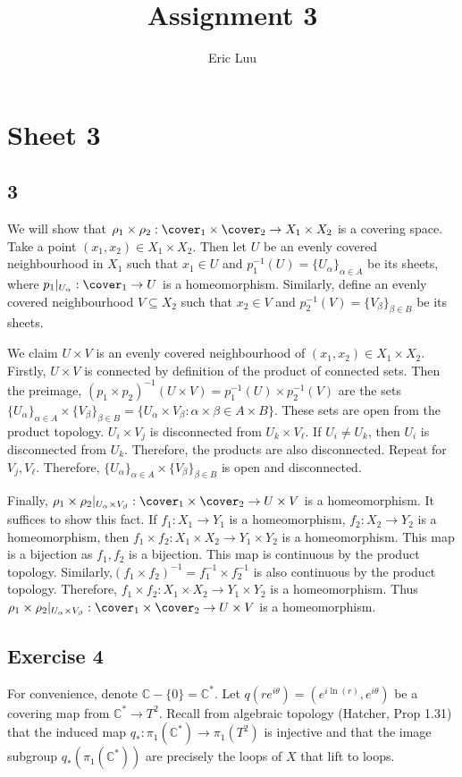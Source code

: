 \documentclass{article}
\title{Assignment 3}
\author{Eric Luu}
\theoremstyle{definition}
\numberwithin{theorem}{section}
\numberwithin{equation}{section}
\begin{document}
\section{Sheet 3}
\subsection{3}
We will show that $\rho_1 \times \rho_2: \cover_1 \times \cover_2 \rightarrow X_1 \times X_2$ is a covering space. 
Take a point $(x_1, x_2) \in X_1 \times X_2$. Then let $U$ be an evenly covered neighbourhood in $X_1$ such that $x_1 \in U$ and $p_1^{-1}(U) = \{U_\alpha \}_{\alpha \in A}$ be its sheets, where $p_1|_{U_\alpha}: \cover_1 \rightarrow U$ is a homeomorphism. Similarly, define an evenly covered neighbourhood $V \subseteq X_2$ such that $x_2 \in V$ and $p_2^{-1}(V) = \{V_\beta \}_{\beta \in B}$ be its sheets. 

We claim $U \times V$ is an evenly covered neighbourhood of $(x_1, x_2) \in X_1 \times X_2$. Firstly, $U \times V$ is connected by definition of the product of connected sets. Then the preimage, $(p_1 \times p_2)^{-1}(U \times V) = p_1^{-1}(U) \times p_2^{-1}(V)$ are the sets $\{U_\alpha \}_{\alpha \in A} \times \{V_\beta \}_{\beta \in B} = \{U_\alpha \times V_\beta : \alpha \times \beta \in A \times B\}$. These sets are open from the product topology. $U_i \times V_j$ is disconnected from $U_k \times V_\ell$. If $U_i \neq U_k$, then $U_i$ is disconnected from $U_k$. Therefore, the products are also disconnected. Repeat for $V_j, V_\ell$. Therefore, $\{U_\alpha \}_{\alpha \in A} \times \{V_\beta \}_{\beta \in B} $ is open and disconnected.

Finally, $\rho_1 \times \rho_2 |_{U_\alpha \times V_\beta}: \cover_1 \times \cover_2 \rightarrow U \times V$ is a homeomorphism. It suffices to show this fact. If $f_1 : X_1 \rightarrow Y_1$ is a homeomorphism, $f_2 : X_2 \rightarrow Y_2$ is a homeomorphism, then $f_1 \times f_2 : X_1 \times X_2 \rightarrow Y_1 \times Y_2$ is a homeomorphism. This map is a bijection as $f_1, f_2$ is a bijection. This map is continuous by the product topology. Similarly,$(f_1 \times f_2 )^{-1} = f_1^{-1} \times f_2^{-1}$ is also continuous by the product topology. Therefore, $f_1 \times f_2 : X_1 \times X_2 \rightarrow Y_1 \times Y_2$ is a homeomorphism. Thus $\rho_1 \times \rho_2 |_{U_\alpha \times V_\beta}: \cover_1 \times \cover_2 \rightarrow U \times V$ is a homeomorphism. 

\subsection{Exercise 4}
For convenience, denote $\mathbb{C} - \{0\} = \mathbb{C}^*$. 
Let $q(r e^{i \theta}) = (e^{i \ln(r)}, e^{i \theta})$ be a covering map from $\mathbb{C}^* \rightarrow T^2$. Recall from algebraic topology (Hatcher, Prop 1.31) that the induced map $q_* : \pi_1(\mathbb{C}^*) \rightarrow \pi_1(T^2)$ is injective and that the image subgroup $q_*(\pi_1(\mathbb{C}^*))$ are precisely the loops of $X$ that lift to loops. 
\end{document}
